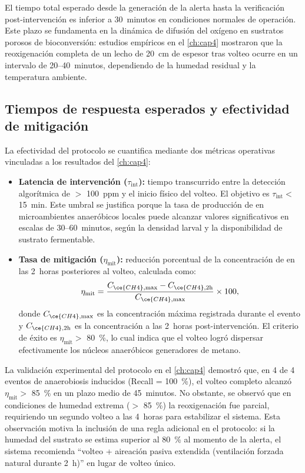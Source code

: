 El tiempo total esperado desde la generación de la alerta hasta la verificación post-intervención es inferior a \num{30}~minutos en condiciones normales de operación. Este plazo se fundamenta en la dinámica de difusión del oxígeno en sustratos porosos de bioconversión: estudios empíricos en el \cref{ch:cap4} mostraron que la reoxigenación completa de un lecho de \num{20}~cm de espesor tras volteo ocurre en un intervalo de \num{20}--\num{40}~minutos, dependiendo de la humedad residual y la temperatura ambiente.

\subsection{Tiempos de respuesta esperados y efectividad de mitigación}
\label{subsec:cap5_tiempos}

La efectividad del protocolo se cuantifica mediante dos métricas operativas vinculadas a los resultados del \cref{ch:cap4}:

\begin{itemize}
    \item \textbf{Latencia de intervención ($\tau_{\text{int}}$):} tiempo transcurrido entre la detección algorítmica de  $>$ \num{100}~ppm y el inicio físico del volteo. El objetivo es $\tau_{\text{int}} <$ \num{15}~min. Este umbral se justifica porque la tasa de producción de  en microambientes anaeróbicos locales puede alcanzar valores significativos en escalas de \num{30}--\num{60}~minutos, según la densidad larval y la disponibilidad de sustrato fermentable.
    
    \item \textbf{Tasa de mitigación ($\eta_{\text{mit}}$):} reducción porcentual de la concentración de  en las \num{2}~horas posteriores al volteo, calculada como:
    \begin{equation}
        \eta_{\text{mit}} = \frac{C_{\ce{CH4},\text{max}} - C_{\ce{CH4},2\text{h}}}{C_{\ce{CH4},\text{max}}} \times 100,
        \label{eq:eta_mitigacion}
    \end{equation}
    donde $C_{\ce{CH4},\text{max}}$ es la concentración máxima registrada durante el evento y $C_{\ce{CH4},2\text{h}}$ es la concentración a las \num{2}~horas post-intervención. El criterio de éxito es $\eta_{\text{mit}} >$ \num{80}~\%, lo cual indica que el volteo logró dispersar efectivamente los núcleos anaeróbicos generadores de metano.
\end{itemize}

La validación experimental del protocolo en el \cref{ch:cap4} demostró que, en \num{4} de \num{4} eventos de anaerobiosis inducidos (Recall = \num{100}~\%), el volteo completo alcanzó $\eta_{\text{mit}} >$ \num{85}~\% en un plazo medio de \num{45}~minutos. No obstante, se observó que en condiciones de humedad extrema ($>$ \num{85}~\%) la reoxigenación fue parcial, requiriendo un segundo volteo a las \num{4}~horas para estabilizar el sistema. Esta observación motiva la inclusión de una regla adicional en el protocolo: si la humedad del sustrato se estima superior al \num{80}~\% al momento de la alerta, el sistema recomienda ``volteo + aireación pasiva extendida (ventilación forzada natural durante \num{2}~h)'' en lugar de volteo único.

